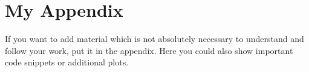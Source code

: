 \chapter{My Appendix}
\label{app:a}

If you want to add material which is not absolutely necessary to understand and
follow your work, put it in the appendix. Here you could also show important
code snippets or additional plots.
